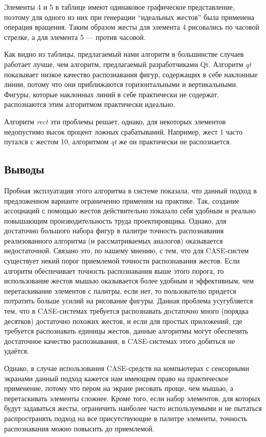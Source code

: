 \documentclass[a5paper]{article}
\begin{document}
Элементы 4 и 5 в таблице имеют одинаковое графическое представление, поэтому для одного из них при генерации ``идеальных жестов'' была применена операция вращения. Таким образом жесты для элемента 4 рисовались по часовой стрелке, а для элемента 5 --- против часовой.

Как видно из таблицы, предлагаемый нами алгоритм в большинстве случаев работает лучше, чем алгоритм, предлагаемый разработчиками Qt. Алгоритм \textit{qt} показывает низкое качество распознавания фигур, содержащих в себе наклонные линии, потому что они приближаются горизонтальными и вертикальными. Фигуры, которые наклонных линий в себе практически не содержат, распознаются этим алгоритмом практически идеально.

Алгоритм \textit{rect} эти проблемы решает, однако, для некоторых элементов недопустимо высок процент ложных срабатываний. Например, жест 1 часто путался с жестом 10, алгоритмом \textit{qt} же он практически не распознается. 

\subsection{Выводы}
Пробная эксплуатация этого алгоритма в системе показала, что данный подход в предложенном варианте ограниченно применим на практике. Так, создание ассоциаций с помощью жестов действительно показало себя удобным и реально повышающим производительность труда проектировщика. Однако, для достаточно большого набора фигур в палитре точность распознавания реализованного алгоритма (и рассматриваемых аналогов) оказывается недостаточной. Связано это, по нашему мнению, с тем, что для CASE-систем существует некий порог приемлемой точности распознавания жестов. Если алгоритм обеспечивает точность распознавания выше этого порога, то использование жестов мышью оказывается более удобным и эффективным, чем перетаскивание элементов с палитры, если нет, то пользователю придется потратить больше усилий на рисование фигуры. Данная проблема усугубляется тем, что в CASE-системах требуется распознавать достаточно много (порядка десятков) достаточно похожих жестов, и если для простых приложений, где требуется распознавать единицы жестов, данные алгоритмы могут обеспечить достаточное качество распознавания, в CASE-системах этого добиться не удаётся.

Однако, в случае использования CASE-средств на компьютерах с сенсорными экранами данный подход кажется нам имеющим право на практическое применение, потому что пером на экране рисовать проще, чем мышью, а перетаскивать элементы сложнее. Кроме того, если набор элементов, для которых будут задаваться жесты, ограничить наиболее часто используемыми и не пытаться распространять подход на все присутствующие в палитре элементы, точность распознавания можно повысить до приемлемой.
\end{document}
